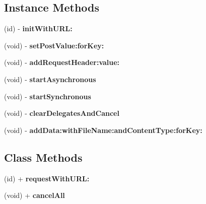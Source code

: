 \subsection*{Instance Methods}
\begin{DoxyCompactItemize}
\item 
\mbox{\label{interface_t_b_s_d_k_connection_ad00b7347f7abc5c7875e6e71c3e0858c}} 
(id) -\/ {\bfseries init\+With\+U\+R\+L\+:}
\item 
\mbox{\label{interface_t_b_s_d_k_connection_ab8598804ee5fd1703654bf429dc05eb7}} 
(void) -\/ {\bfseries set\+Post\+Value\+:for\+Key\+:}
\item 
\mbox{\label{interface_t_b_s_d_k_connection_a3cd73e81220d3e42dee4b5601befe244}} 
(void) -\/ {\bfseries add\+Request\+Header\+:value\+:}
\item 
\mbox{\label{interface_t_b_s_d_k_connection_acb8a1bdd4b712c94ca863f5681230137}} 
(void) -\/ {\bfseries start\+Asynchronous}
\item 
\mbox{\label{interface_t_b_s_d_k_connection_a92f0f6c7cd543da6880c3f90501d250d}} 
(void) -\/ {\bfseries start\+Synchronous}
\item 
\mbox{\label{interface_t_b_s_d_k_connection_ae367e92e58655ab891d942b408a13432}} 
(void) -\/ {\bfseries clear\+Delegates\+And\+Cancel}
\item 
\mbox{\label{interface_t_b_s_d_k_connection_ad49435206d4ceb54ab2e889051775bb4}} 
(void) -\/ {\bfseries add\+Data\+:with\+File\+Name\+:and\+Content\+Type\+:for\+Key\+:}
\end{DoxyCompactItemize}
\subsection*{Class Methods}
\begin{DoxyCompactItemize}
\item 
\mbox{\label{interface_t_b_s_d_k_connection_a6030603f632e45bbc3a0a422f420b266}} 
(id) + {\bfseries request\+With\+U\+R\+L\+:}
\item 
\mbox{\label{interface_t_b_s_d_k_connection_a963afcc20cf7ac4a1d752c2e290bd216}} 
(void) + {\bfseries cancel\+All}
\end{DoxyCompactItemize}
